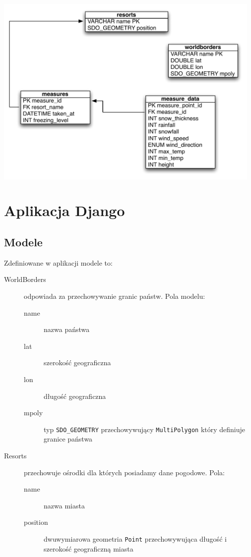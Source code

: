 \documentclass[12pt]{article}
\begin{document}
\includegraphics[width=35em]{images/erd_diagram.pdf}

\section{Aplikacja Django}
\subsection{Modele}
Zdefiniowane w aplikacji modele to:
\begin{description}
\item[WorldBorders] odpowiada za przechowywanie granic państw. Pola modelu:
  \begin{description}
  \item[name] nazwa państwa
  \item[lat] szerokość geograficzna
  \item[lon] długość geograficzna
  \item[mpoly] typ \texttt{SDO\_GEOMETRY} przechowywujący \texttt{MultiPolygon} który
    definiuje granice państwa
  \end{description}
\item[Resorts] przechowuje ośrodki dla których posiadamy dane pogodowe. Pola:
  \begin{description}
    \item[name] nazwa miasta
    \item[position] dwuwymiarowa geometria \texttt{Point} przechowywująca długość i
      szerokość geograficzną miasta
  \end{description}
\end{description}
\end{document}
